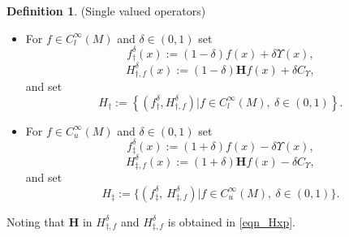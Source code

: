\documentclass[a4paper]{article}
\numberwithin{equation}{section}
\theoremstyle{definition}
\newtheorem{definition}[theorem]{Definition}
\begin{document}
\begin{definition}(Single valued operators)
\begin{itemize}
\item For $f\in C^{\infty}_l(M)$ and $\delta \in(0,1)$ set
\begin{equation*}
f^{\delta}_{\dagger}(x):=(1-\delta)f(x)+\delta \Upsilon(x),
\end{equation*}
\begin{equation*}
H^{\delta}_{\dagger,f}(x):=(1-\delta)\mathbf{H}f(x)+\delta C_{\Upsilon},
\end{equation*}
and set
\begin{equation*}
H_{\dagger}:=\left\{\left(f^{\delta}_\dagger,H^{\delta}_{\dagger,f}\right)\Big |f\in C^\infty_l(M),~\delta\in(0,1)\right\}.
\end{equation*}
\item For $f\in C^{\infty}_u(M)$ and $\delta\in(0,1)$ set
\begin{equation*}
f^{\delta}_{\ddagger}(x):=(1+\delta)f(x)-\delta \Upsilon(x),
\end{equation*}
\begin{equation*}
H^{\delta}_{\ddagger,f}(x):=(1+\delta)\mathbf{H}f(x)-\delta C_{\Upsilon},
\end{equation*}
and set
\begin{equation*}
H_{\ddagger}:=\Big\{\left(f^\delta_\ddagger,~H^\delta_{\ddagger,f}\right)\Big |f\in C^\infty_u(M),~\delta\in(0,1)\Big\}.
\end{equation*}
\end{itemize}
Noting that $\mathbf{H}$ in $H_{\dagger,f}^\delta$ and $H_{\ddagger,f}^\delta$ is obtained in \eqref{eqn_Hxp}.
\end{definition}
\end{document}
